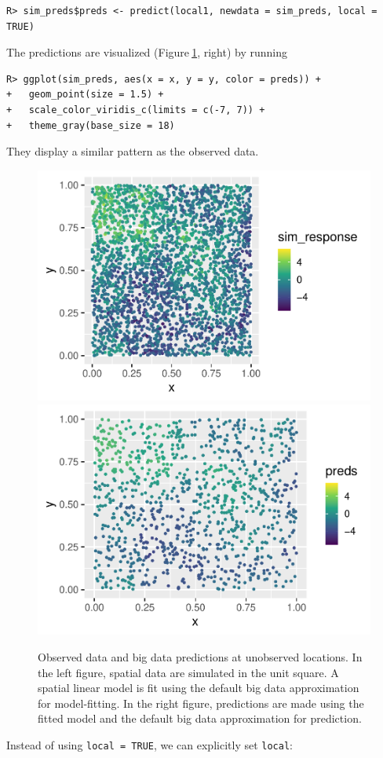 \documentclass[10pt,letterpaper]{article}
\begin{document}
\begin{verbatim}
R> sim_preds$preds <- predict(local1, newdata = sim_preds, local = TRUE)
\end{verbatim}

The predictions are visualized (Figure\(~\)\ref{fig:sim_preds}, right)
by running

\begin{verbatim}
R> ggplot(sim_preds, aes(x = x, y = y, color = preds)) +
+   geom_point(size = 1.5) +
+   scale_color_viridis_c(limits = c(-7, 7)) + 
+   theme_gray(base_size = 18)
\end{verbatim}

They display a similar pattern as the observed data.

\begin{figure}

{\centering \includegraphics[width=0.49\linewidth]{preprint_files/figure-latex/sim_preds-1} \includegraphics[width=0.49\linewidth]{preprint_files/figure-latex/sim_preds-2} 

}

\caption{Observed data and big data predictions at unobserved locations. In the left figure, spatial data are simulated in the unit square. A spatial linear model is fit using the default big data approximation for model-fitting. In the right figure, predictions are made using the fitted model and the default big data approximation for prediction.}\label{fig:sim_preds}
\end{figure}

Instead of using \texttt{local\ =\ TRUE}, we can explicitly set
\texttt{local}:
\end{document}
